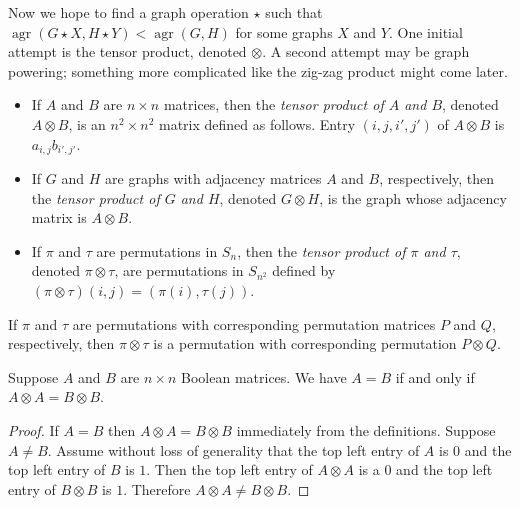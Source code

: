 \documentclass{article}
\newcommand{\1}{\mathbf{1}}
\DeclareMathOperator{\agr}{agr}
\begin{document}
Now we hope to find a graph operation $\star$ such that $\agr(G \star X, H \star Y) < \agr(G, H)$ for some graphs $X$ and $Y$.
One initial attempt is the tensor product, denoted $\otimes$.
A second attempt may be graph powering; something more complicated like the zig-zag product might come later.

\begin{definition}
  \mbox{}
  \begin{itemize}
  \item
    If $A$ and $B$ are $n \times n$ matrices, then the \emph{tensor product of $A$ and $B$}, denoted $A \otimes B$, is an $n^2 \times n^2$ matrix defined as follows.
    Entry $(i, j, i', j')$ of $A \otimes B$ is $a_{i, j} b_{i', j'}$.
  \item If $G$ and $H$ are graphs with adjacency matrices $A$ and $B$, respectively, then the \emph{tensor product of $G$ and $H$}, denoted $G \otimes H$, is the graph whose adjacency matrix is $A \otimes B$.
  \item If $\pi$ and $\tau$ are permutations in $S_n$, then the \emph{tensor product of $\pi$ and $\tau$}, denoted $\pi \otimes \tau$, are permutations in $S_{n^2}$ defined by $(\pi \otimes \tau)(i, j) = (\pi(i), \tau(j))$.
  \end{itemize}
\end{definition}

\begin{theorem}
  If $\pi$ and $\tau$ are permutations with corresponding permutation matrices $P$ and $Q$, respectively, then $\pi \otimes \tau$ is a permutation with corresponding permutation $P \otimes Q$.
\end{theorem}

\begin{theorem}
  Suppose $A$ and $B$ are $n \times n$ Boolean matrices.
  We have $A = B$ if and only if $A \otimes A = B \otimes B$.
\end{theorem}
\begin{proof}
  If $A = B$ then $A \otimes A = B \otimes B$ immediately from the definitions.
  Suppose $A \neq B$.
  Assume without loss of generality that the top left entry of $A$ is $0$ and the top left entry of $B$ is $1$.
  Then the top left entry of $A \otimes A$ is a $0$ and the top left entry of $B \otimes B$ is $1$.
  Therefore $A \otimes A \neq B \otimes B$.
\end{proof}
\end{document}
